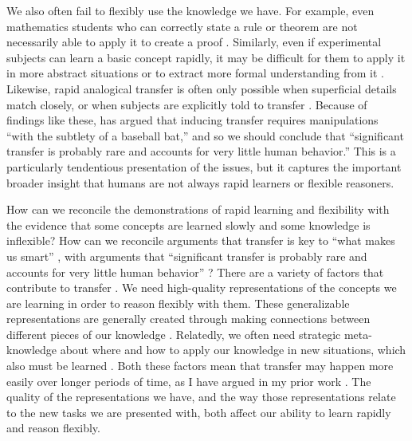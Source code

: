 \documentclass[11pt]{article}
\begin{document}
We also often fail to flexibly use the knowledge we have. For example, even mathematics students who can correctly state a rule or theorem are not necessarily able to apply it to create a proof \citep{Weber2001}. Similarly, even if experimental subjects can learn a basic concept rapidly, it may be difficult for them to apply it in more abstract situations or to extract more formal understanding from it \citep[e.g.]{Lampinen2017b}. Likewise, rapid analogical transfer is often only possible when superficial details match closely, or when subjects are explicitly told to transfer \citep[e.g.]{Gick1980}. Because of findings like these, \citet{Detterman1993} has argued that inducing transfer requires manipulations ``with the subtlety of a baseball bat,'' and so we should conclude that ``significant transfer is probably rare and accounts for very little human behavior.'' This is a particularly tendentious presentation of the issues, but it captures the important broader insight that humans are not always rapid learners or flexible reasoners. \par 
How can we reconcile the demonstrations of rapid learning and flexibility with the evidence that some concepts are learned slowly and some knowledge is inflexible? How can we reconcile arguments that transfer is key to ``what makes us smart'' \citep{Gentner2003}, with arguments that ``significant transfer is probably rare and accounts for very little human behavior'' \citep{Detterman1993}? There are a variety of factors that contribute to transfer \citep{Barnett2002, Lampinen2017a}. We need high-quality representations of the concepts we are learning in order to reason flexibly with them. These generalizable representations are generally created through making connections between different pieces of our knowledge \citep{Wilensky1991, Schwartz2015}. Relatedly, we often need strategic meta-knowledge about where and how to apply our knowledge in new situations, which also must be learned \citep{Weber2001}. Both these factors mean that transfer may happen more easily over longer periods of time, as I have argued in my prior work \citep{Lampinen2017a}. The quality of the representations we have, and the way those representations relate to the new tasks we are presented with, both affect our ability to learn rapidly and reason flexibly. \par 
\end{document}
